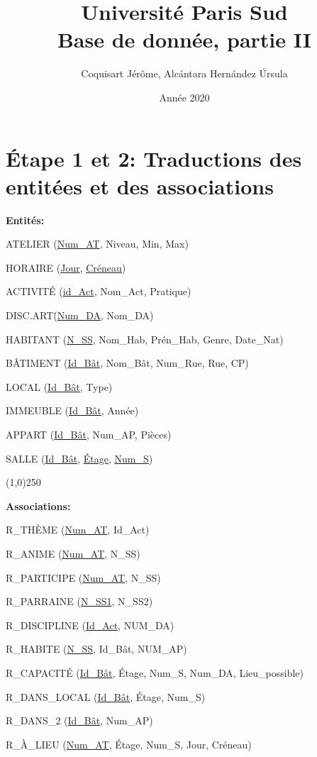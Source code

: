 \documentclass[a4paper,10.5pt]{report}
\title{\textbf{\Huge  Université Paris Sud}\\ Base de donnée, partie II}
\author{Coquisart Jérôme, Alcántara Hernández Úrsula}
\date{Année 2020}
\begin{document}
    \maketitle
    \newpage
    \newpage

    \section*{Étape 1 et 2: Traductions des entitées et des associations}

	\textbf{Entités:}
	
	ATELIER (\underline{Num\_AT}, Niveau, Min, Max)

	HORAIRE (\underline{Jour}, \underline{Créneau})

	ACTIVITÉ (\underline{id\_Act}, Nom\_Act, Pratique) 

	DISC.ART\. (\underline{Num\_DA}, Nom\_DA)

	HABITANT (\underline{N\_SS}, Nom\_Hab, Prén\_Hab, Genre, Date\_Nat)

	BÂTIMENT (\underline{Id\_Bât}, Nom\_Bât, Num\_Rue, Rue, CP)

	LOCAL (\underline{Id\_Bât}, Type)

	IMMEUBLE (\underline{Id\_Bât}, Année)

	APPART (\underline{Id\_Bât}, Num\_AP, Pièces)

	SALLE (\underline{Id\_Bât}, \underline{Étage}, \underline{Num\_S})
	
	\begin{center}
	\line(1,0){250}
	\end{center}

	\textbf{Associations:}
	
	R\_THÈME (\underline{Num\_AT}, Id\_Act)

	R\_ANIME (\underline{Num\_AT}, N\_SS)

	R\_PARTICIPE (\underline{Num\_AT}, N\_SS)

	R\_PARRAINE (\underline{N\_SS1}, N\_SS2)

	R\_DISCIPLINE (\underline{Id\_Act}, NUM\_DA)

	R\_HABITE (\underline{N\_SS}, Id\_Bât, NUM\_AP)

	R\_CAPACITÉ (\underline{Id\_Bât}, Étage, Num\_S, Num\_DA, Lieu\_possible)

	R\_DANS\_LOCAL (\underline{Id\_Bât}, Étage, Num\_S)

	R\_DANS\_2 (\underline{Id\_Bât}, Num\_AP)

	R\_À\_LIEU (\underline{Num\_AT}, Étage, Num\_S, Jour, Créneau)
\end{document}
